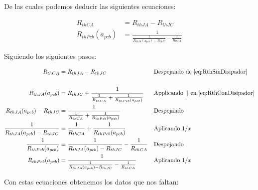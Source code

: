 De las cuales podemos deducir las siguientes ecuaciones:

\begin{subequations}
    \label{eq:ResRth}
    \begin{align}
        \label{eq:RthJA} R_{thCA}            & =R_{thJA}-R_{thJC}                                                    \\
        \label{eq:RthPcb} R_{thPcb}(a_{pcb}) & =\frac{1}{\frac{1}{R_{thJA}(a_{pcb}) - R_{thJC}} -\frac{1}{R_{thCA}}}
    \end{align}
\end{subequations}

Siguiendo los siguientes pasos:

\begin{align*}
    R_{thCA}                               & =R_{thJA}-R_{thJC}                                                    &  & \text{Despejando de \ref{eq:RthSinDisipador}}      \\
    \\
    R_{thJA}(a_{pcb})                      & =R_{thJC}+\frac{1}{\frac{1}{R_{thCA}}+\frac{1}{R_{thPcb}(a_{pcb})}}   &  & \text{Applicando  || en  \ref{eq:RthConDisipador}} \\
    R_{thJA}(a_{pcb}) - R_{thJC}           & =\frac{1}{\frac{1}{R_{thCA}}+\frac{1}{R_{thPcb}(a_{pcb})}}            &  & \text{Despejando}                                  \\
    \frac{1}{R_{thJA}(a_{pcb}) - R_{thJC}} & = \frac{1}{R_{thCA}}+\frac{1}{R_{thPcb}(a_{pcb})}                     &  & \text{Aplicando $1/x$}                             \\
    \frac{1}{R_{thPcb}(a_{pcb})}           & =\frac{1}{R_{thJA}(a_{pcb}) - R_{thJC}} -\frac{1}{R_{thCA}}           &  & \text{Despejando}                                  \\
    R_{thPcb}(a_{pcb})                     & =\frac{1}{\frac{1}{R_{thJA}(a_{pcb}) - R_{thJC}} -\frac{1}{R_{thCA}}} &  & \text{Aplicando $1/x$}
\end{align*}

Con estas ecuaciones obtenemos los datos que nos faltan:


